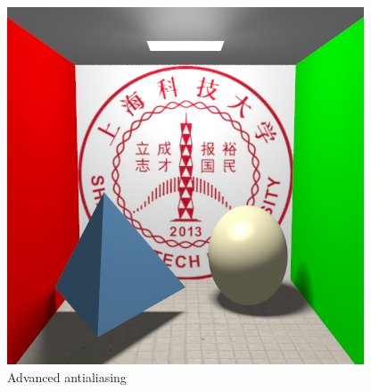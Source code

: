 \documentclass[acmtog]{acmart}
\begin{document}
\begin{figure}[h]
{\begin{minipage}[b]{0.8\linewidth}
			\includegraphics[width=\textwidth]{images/result-halman-seq-antialiasing.png}
		\end{minipage}
	}
	\caption{Advanced antialiasing}
\end{figure}
\end{document}
